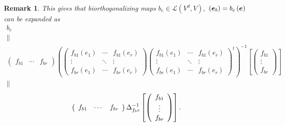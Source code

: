 \documentclass[aps,preprint]{revtex4}
\newtheorem{remark}[theorem]{Remark}
\begin{document}
\begin{remark}
This gives that biorthogonalizing maps $b_{e}\in \mathcal{L}\left(
V^{d},V\right) ,$ $\left( \boldsymbol{e}_{b}\right) =b_{e}\left( \boldsymbol{%
e}\right) $ can be expanded as%
\begin{gather}
b_{e} \\
\parallel \\
\left( 
\begin{array}{ccc}
f_{b1} & \cdots & f_{br}%
\end{array}%
\right) \left( \left( 
\begin{array}{ccc}
f_{b1}\left( e_{1}\right) & \cdots & f_{b1}\left( e_{r}\right) \\ 
\vdots & \ddots & \vdots \\ 
f_{br}\left( e_{1}\right) & \cdots & f_{br}\left( e_{r}\right)%
\end{array}%
\right) \left( 
\begin{array}{ccc}
f_{b1}\left( e_{1}\right) & \cdots & f_{b1}\left( e_{r}\right) \\ 
\vdots & \ddots & \vdots \\ 
f_{br}\left( e_{1}\right) & \cdots & f_{br}\left( e_{r}\right)%
\end{array}%
\right) ^{t}\right) ^{-1}\left[ \left( 
\begin{array}{c}
f_{b1} \\ 
\vdots \\ 
f_{br}%
\end{array}%
\right) \right] \\
\parallel
\end{gather}%
\begin{equation}
\left( 
\begin{array}{ccc}
f_{b1} & \cdots & f_{br}%
\end{array}%
\right) {\LARGE \Delta }_{f_{b}e}^{-1}\left[ \left( 
\begin{array}{c}
f_{b1} \\ 
\vdots \\ 
f_{br}%
\end{array}%
\right) \right] .
\end{equation}
\end{remark}
\end{document}
